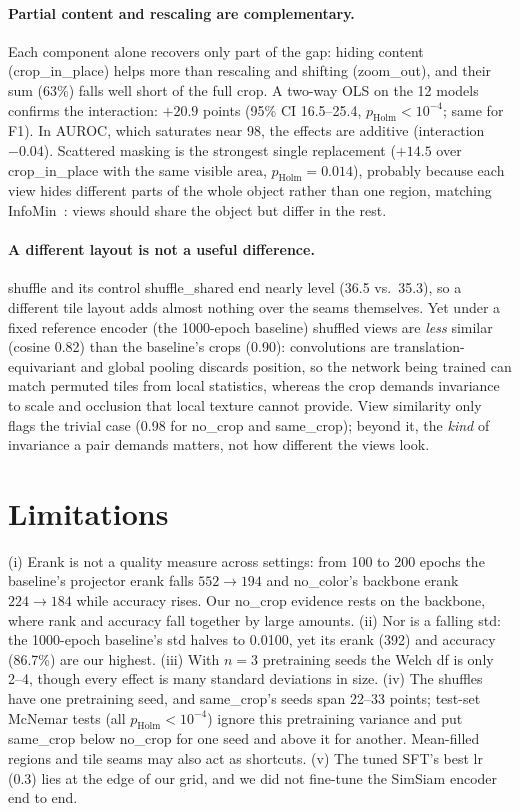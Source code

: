 \documentclass[10pt,twocolumn,letterpaper]{article}
\begin{document}
\paragraph{Partial content and rescaling are complementary.}
Each component alone recovers only part of the gap: hiding content (crop\_in\_place) helps more than rescaling and shifting (zoom\_out), and their sum (63\%) falls well short of the full crop. A two-way OLS on the 12 models confirms the interaction: $+20.9$ points (95\% CI 16.5--25.4, $p_\text{Holm}<10^{-4}$; same for F1). In AUROC, which saturates near 98, the effects are additive (interaction $-0.04$).
Scattered masking is the strongest single replacement ($+14.5$ over crop\_in\_place with the same visible area, $p_\text{Holm}{=}0.014$), probably because each view hides different parts of the whole object rather than one region, matching InfoMin~\cite{tian2020infomin}: views should share the object but differ in the rest.

\paragraph{A different layout is not a useful difference.}
shuffle and its control shuffle\_shared end nearly level (36.5 vs.\ 35.3), so a different tile layout adds almost nothing over the seams themselves.
Yet under a fixed reference encoder (the 1000-epoch baseline) shuffled views are \emph{less} similar (cosine 0.82) than the baseline's crops (0.90): convolutions are translation-equivariant and global pooling discards position, so the network being trained can match permuted tiles from local statistics, whereas the crop demands invariance to scale and occlusion that local texture cannot provide.
View similarity only flags the trivial case (0.98 for no\_crop and same\_crop); beyond it, the \emph{kind} of invariance a pair demands matters, not how different the views look.


\section{Limitations}
\label{sec:limitations}

(i) Erank is not a quality measure across settings: from 100 to 200 epochs the baseline's projector erank falls $552\to194$ and no\_color's backbone erank $224\to184$ while accuracy rises. Our no\_crop evidence rests on the backbone, where rank and accuracy fall together by large amounts.
(ii) Nor is a falling std: the 1000-epoch baseline's std halves to 0.0100, yet its erank (392) and accuracy (86.7\%) are our highest.
(iii) With $n{=}3$ pretraining seeds the Welch df is only 2--4, though every effect is many standard deviations in size.
(iv) The shuffles have one pretraining seed, and same\_crop's seeds span 22--33 points; test-set McNemar tests (all $p_\text{Holm}<10^{-4}$) ignore this pretraining variance and put same\_crop below no\_crop for one seed and above it for another. Mean-filled regions and tile seams may also act as shortcuts.
(v) The tuned SFT's best lr (0.3) lies at the edge of our grid, and we did not fine-tune the SimSiam encoder end to end.
\end{document}
